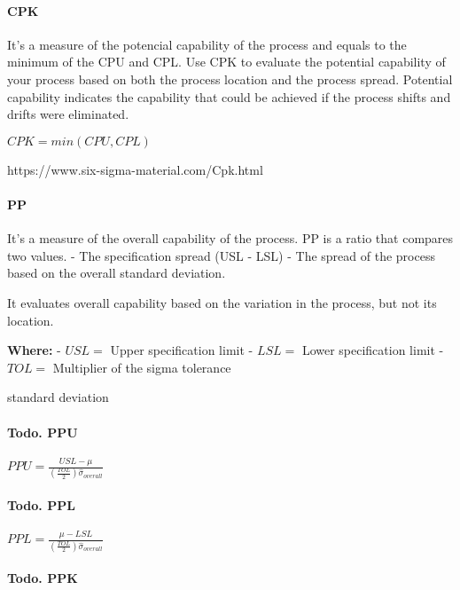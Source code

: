 \documentclass[11pt]{article}
\begin{document}
\hypertarget{cpk}{%
\paragraph{CPK}\label{cpk}}

It's a measure of the potencial capability of the process and equals to
the minimum of the CPU and CPL. Use CPK to evaluate the potential
capability of your process based on both the process location and the
process spread. Potential capability indicates the capability that could
be achieved if the process shifts and drifts were eliminated.

\(CPK = min(CPU, CPL)\)

https://www.six-sigma-material.com/Cpk.html

\hypertarget{pp}{%
\paragraph{PP}\label{pp}}

It's a measure of the overall capability of the process. PP is a ratio
that compares two values. - The specification spread (USL - LSL) - The
spread of the process based on the overall standard deviation.

It evaluates overall capability based on the variation in the process,
but not its location.



\textbf{Where:} - \(USL =\) Upper specification limit - \(LSL =\) Lower
specification limit - \(TOL =\) Multiplier of the sigma tolerance

standard deviation

\hypertarget{todo.-ppu}{%
\paragraph{Todo. PPU}\label{todo.-ppu}}

\(PPU = \frac{USL - \mu }{(\frac{TOL}{2})\hat{\sigma}_{overall}}\)

\hypertarget{todo.-ppl}{%
\paragraph{Todo. PPL}\label{todo.-ppl}}

\(PPL = \frac{\mu - LSL}{(\frac{TOL}{2})\hat{\sigma}_{overall}}\)

\hypertarget{todo.-ppk}{%
\paragraph{Todo. PPK}\label{todo.-ppk}}
\end{document}
